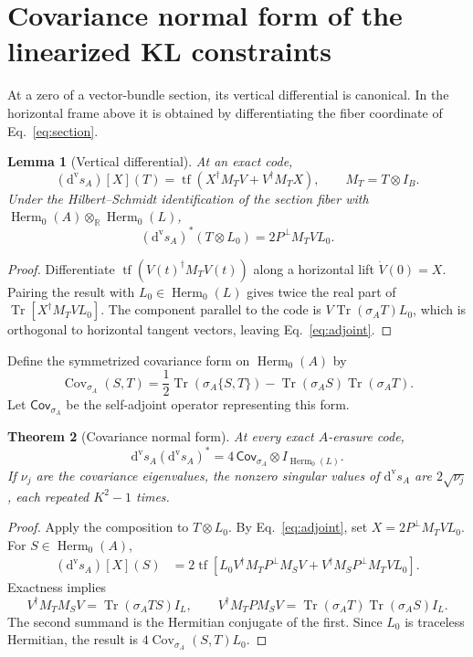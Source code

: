 \documentclass[11pt]{article}
\newtheorem{theorem}{Theorem}[section]
\newtheorem{lemma}[theorem]{Lemma}
\theoremstyle{definition}
\newcommand{\Herm}{\operatorname{Herm}}
\newcommand{\Tr}{\operatorname{Tr}}
\newcommand{\tf}{\operatorname{tf}}
\newcommand{\Cov}{\operatorname{Cov}}
\newcommand{\R}{\mathbb R}
\newcommand{\dvs}{\mathrm d^{\mathrm v}\!s}
\begin{document}
\section{Covariance normal form of the linearized KL constraints}
At a zero of a vector-bundle section, its vertical differential is canonical. In the horizontal frame above it is obtained by differentiating the fiber coordinate of Eq.~\eqref{eq:section}.

\begin{lemma}[Vertical differential]
At an exact code,
\begin{equation}
(\dvs_A)[X](T)=\tf\!\left(X^\dagger M_TV+V^\dagger M_TX\right),\qquad M_T=T\otimes I_B.
\label{eq:ds}
\end{equation}
Under the Hilbert--Schmidt identification of the section fiber with $\Herm_0(A)\otimes_{\R}\Herm_0(L)$,
\begin{equation}
(\dvs_A)^*(T\otimes L_0)=2P^\perp M_TVL_0.
\label{eq:adjoint}
\end{equation}
\end{lemma}
\begin{proof}
Differentiate $\tf(V(t)^\dagger M_TV(t))$ along a horizontal lift $\dot V(0)=X$. Pairing the result with $L_0\in\Herm_0(L)$ gives twice the real part of $\Tr[X^\dagger M_TVL_0]$. The component parallel to the code is $V\Tr(\sigma_AT)L_0$, which is orthogonal to horizontal tangent vectors, leaving Eq.~\eqref{eq:adjoint}.
\end{proof}

Define the symmetrized covariance form on $\Herm_0(A)$ by
\begin{equation}
\Cov_{\sigma_A}(S,T)=\frac12\Tr\!\left(\sigma_A\{S,T\}\right)-\Tr(\sigma_AS)\Tr(\sigma_AT).
\label{eq:cov}
\end{equation}
Let $\mathsf{Cov}_{\sigma_A}$ be the self-adjoint operator representing this form.

\begin{theorem}[Covariance normal form]
At every exact $A$-erasure code,
\begin{equation}
\boxed{\dvs_A(\dvs_A)^*=4\,\mathsf{Cov}_{\sigma_A}\otimes I_{\Herm_0(L)}.}
\label{eq:covnormal}
\end{equation}
If $\nu_j$ are the covariance eigenvalues, the nonzero singular values of $\dvs_A$ are $2\sqrt{\nu_j}$, each repeated $K^2-1$ times.
\end{theorem}
\begin{proof}
Apply the composition to $T\otimes L_0$. By Eq.~\eqref{eq:adjoint}, set $X=2P^\perp M_TVL_0$. For $S\in\Herm_0(A)$,
\begin{align*}
(\dvs_A)[X](S)
&=2\tf\!\left[L_0V^\dagger M_TP^\perp M_SV+V^\dagger M_SP^\perp M_TVL_0\right].
\end{align*}
Exactness implies
\[
V^\dagger M_TM_SV=\Tr(\sigma_A TS)I_L,
\qquad
V^\dagger M_TPM_SV=\Tr(\sigma_AT)\Tr(\sigma_AS)I_L.
\]
The second summand is the Hermitian conjugate of the first. Since $L_0$ is traceless Hermitian, the result is $4\Cov_{\sigma_A}(S,T)L_0$.
\end{proof}
\end{document}
